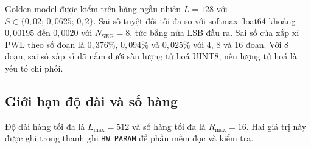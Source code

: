 Golden model được kiểm trên hàng ngẫu nhiên $L = 128$ với $S \in \{0{,}02;\, 0{,}0625;\, 0{,}2\}$. Sai số tuyệt đối tối đa so với softmax float64 khoảng $0{,}00195$ đến $0{,}0020$ với $N_{\text{SEG}} = 8$, tức bằng nửa LSB đầu ra. Sai số của xấp xỉ PWL theo số đoạn là $0{,}376\%$, $0{,}094\%$ và $0{,}025\%$ với 4, 8 và 16 đoạn. Với 8 đoạn, sai số xấp xỉ đã nằm dưới sàn lượng tử hoá UINT8, nên lượng tử hoá là yếu tố chi phối.

\subsection{Giới hạn độ dài và số hàng}

Độ dài hàng tối đa là $L_{\max} = 512$ và số hàng tối đa là $R_{\max} = 16$. Hai giá trị này được ghi trong thanh ghi \texttt{HW\_PARAM} để phần mềm đọc và kiểm tra.
